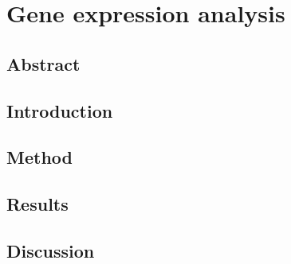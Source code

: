 \section{Gene expression analysis}

    \subsection{Abstract}

        \noindent

    \subsection{Introduction}

        \noindent

    \subsection{Method}

        \noindent

    \subsection{Results}

        \noindent

    \subsection{Discussion}

        \noindent
    
